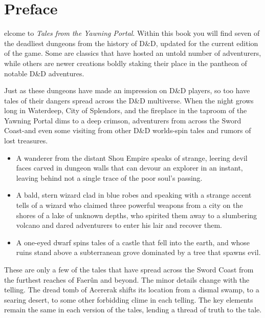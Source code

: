 \documentclass[10pt,a4paper,twoside,bg=print,twocolumn,openany,nodeprecatedcode]{dndbook}
\begin{document}
\frontmatter
\maketitle
\tableofcontents
\mainmatter
\chapter{Preface}
elcome to \textit{Tales from the Yawning Portal}. Within this book you will find seven of the deadliest dungeons from the history of D\&D, updated for the current edition of the game. Some are classics that have hosted an untold number of adventurers, while others are newer creations boldly staking their place in the pantheon of notable D\&D adventures.


Just as these dungeons have made an impression on D\&D players, so too have tales of their dangers spread across the D\&D multiverse. When the night grows long in Waterdeep, City of Splendors, and the fireplace in the taproom of the Yawning Portal dims to a deep crimson, adventurers from across the Sword Coast-and even some visiting from other D\&D worlds-spin tales and rumors of lost treasures.


\begin{itemize}
\item A wanderer from the distant Shou Empire speaks of strange, leering devil faces carved in dungeon walls that can devour an explorer in an instant, leaving behind not a single trace of the poor soul's passing.
\item A bald, stern wizard clad in blue robes and speaking with a strange accent tells of a wizard who claimed three powerful weapons from a city on the shores of a lake of unknown depths, who spirited them away to a slumbering volcano and dared adventurers to enter his lair and recover them.
\item A one-eyed dwarf spins tales of a castle that fell into the earth, and whose ruins stand above a subterranean grove dominated by a tree that spawns evil.
\end{itemize}

These are only a few of the tales that have spread across the Sword Coast from the furthest reaches of Faerûn and beyond. The minor details change with the telling. The dread tomb of Acererak shifts its location from a dismal swamp, to a searing desert, to some other forbidding clime in each telling. The key elements remain the same in each version of the tales, lending a thread of truth to the tale.
\end{document}
